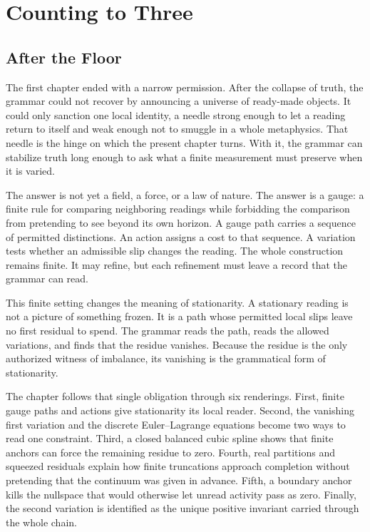 \chapter{Counting to Three}
\label{chap:finite-gauge-single-invariant}

\section{After the Floor}

The first chapter ended with a narrow permission. After the collapse of
truth, the grammar could not recover by announcing a universe of ready-made
objects. It could only sanction one local identity, a needle strong enough
to let a reading return to itself and weak enough not to smuggle in a whole
metaphysics. That needle is the hinge on which the present chapter turns.
With it, the grammar can stabilize truth long enough to ask what a finite
measurement must preserve when it is varied.

The answer is not yet a field, a force, or a law of nature. The answer is a
gauge: a finite rule for comparing neighboring readings while forbidding
the comparison from pretending to see beyond its own horizon. A gauge path
carries a sequence of permitted distinctions. An action assigns a cost to
that sequence. A variation tests whether an admissible slip changes the
reading. The whole construction remains finite. It may refine, but each
refinement must leave a record that the grammar can read.

This finite setting changes the meaning of stationarity. A stationary
reading is not a picture of something frozen. It is a path whose permitted
local slips leave no first residual to spend. The grammar reads the path,
reads the allowed variations, and finds that the residue vanishes. Because
the residue is the only authorized witness of imbalance, its vanishing is
the grammatical form of stationarity.

The chapter follows that single obligation through six renderings. First,
finite gauge paths and actions give stationarity its local reader. Second,
the vanishing first variation and the discrete Euler--Lagrange equations
become two ways to read one constraint. Third, a closed balanced cubic
spline shows that finite anchors can force the remaining residue to zero.
Fourth, real partitions and squeezed residuals explain how finite
truncations approach completion without pretending that the continuum was
given in advance. Fifth, a boundary anchor kills the nullspace that would
otherwise let unread activity pass as zero. Finally, the second variation is
identified as the unique positive invariant carried through the whole
chain.

